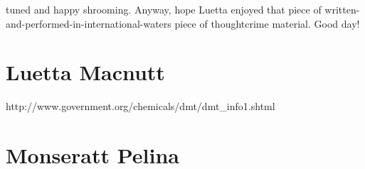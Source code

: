 \documentclass[12pt]{book}
\begin{document}
tuned and happy shrooming. Anyway, hope Luetta enjoyed that piece of written-and-performed-in-international-waters piece of thoughtcrime material. Good day!



\chapter{Luetta Macnutt}

http://www.government.org/chemicals/dmt/dmt\_info1.shtml






\chapter{Monseratt Pelina}
\end{document}
